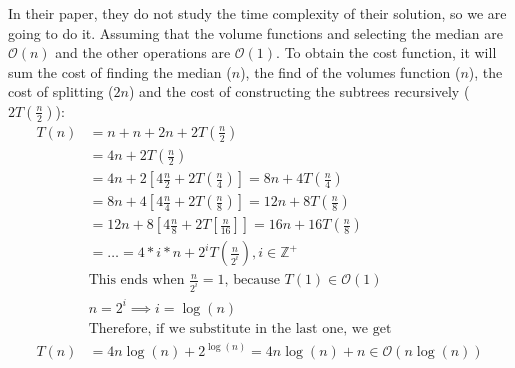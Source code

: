 In their paper, they do not study the time complexity of their solution, so we are going to do it. Assuming that the volume functions and selecting the median are $\mathcal{O}(n)$ and the other operations are $\mathcal{O}(1)$. To obtain the cost function, it will sum the cost of finding the median ($n$), the find of the volumes function ($n$), the cost of splitting ($2n$) and the cost of constructing the subtrees recursively ($2T(\frac{n}{2})$):
\begin{align*}
    T(n) &= n + n + 2n + 2T(\frac{n}{2})\\
    &= 4n + 2T(\frac{n}{2}) \\
    &= 4n + 2[4\frac{n}{2} + 2T(\frac{n}{4})] = 8n + 4T(\frac{n}{4}) \\
    &= 8n + 4[4\frac{n}{4} + 2T(\frac{n}{8})] = 12n + 8T(\frac{n}{8}) \\
    &= 12n + 8[4\frac{n}{8} + 2T[\frac{n}{16}]] = 16n + 16T(\frac{n}{8}) \\
    &= \dots = 4*i*n + 2^iT(\frac{n}{2^i}), i \in \mathbb{Z}^+ \\
    &\text{This ends when $\frac{n}{2^i} = 1$, because $T(1)\in\mathcal{O}(1)$} \\
    &n = 2^i \implies i = \log{}(n) \\
    &\text{Therefore, if we substitute in the last one, we get} \\
    T(n) &= 4n\log{}(n)+2^{\log{}(n)} = 4n\log{}(n)+n \in \mathcal{O}(n\log{}(n))
\end{align*}

